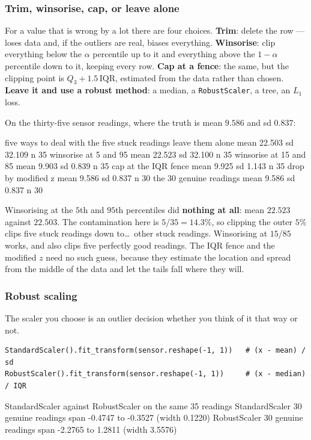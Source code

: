 \documentclass[11pt]{article}
\begin{document}
\subsubsection*{Trim, winsorise, cap, or leave alone}

For a value that is wrong by a lot there are four choices. \textbf{Trim}:
delete the row --- loses data and, if the outliers are real, biases everything.
\textbf{Winsorise}: clip everything below the $\alpha$ percentile up to it and
everything above the $1-\alpha$ percentile down to it, keeping every row.
\textbf{Cap at a fence}: the same, but the clipping point is
$Q_3 + 1.5\,\mathrm{IQR}$, estimated from the data rather than chosen.
\textbf{Leave it and use a robust method}: a median, a
\texttt{RobustScaler}, a tree, an $L_1$ loss.

On the thirty-five sensor readings, where the truth is mean $9.586$ and
sd $0.837$:

\begin{codeout}
five ways to deal with the five stuck readings
  leave them alone         mean  22.503   sd  32.109   n 35
  winsorise at 5 and 95    mean  22.523   sd  32.100   n 35
  winsorise at 15 and 85   mean   9.903   sd   0.839   n 35
  cap at the IQR fence     mean   9.925   sd   1.143   n 35
  drop by modified z       mean   9.586   sd   0.837   n 30
  the 30 genuine readings  mean   9.586   sd   0.837   n 30
\end{codeout}

\begin{caution}
Winsorising at the $5$th and $95$th percentiles did \textbf{nothing at all}:
mean $22.523$ against $22.503$. The contamination here is $5/35 = 14.3\%$, so
clipping the outer $5\%$ clips five stuck readings down to\dots\ other stuck
readings. Winsorising at $15$/$85$ works, and also clips five perfectly good
readings. The IQR fence and the modified $z$ need no such guess, because they
estimate the location and spread from the middle of the data and let the tails
fall where they will.
\end{caution}

\subsubsection*{Robust scaling}

The scaler you choose is an outlier decision whether you think of it that way
or not.

\begin{lstlisting}
StandardScaler().fit_transform(sensor.reshape(-1, 1))   # (x - mean) / sd
RobustScaler().fit_transform(sensor.reshape(-1, 1))     # (x - median) / IQR
\end{lstlisting}
\begin{codeout}
StandardScaler against RobustScaler on the same 35 readings
  StandardScaler  30 genuine readings span -0.4747 to -0.3527  (width 0.1220)
  RobustScaler    30 genuine readings span -2.2765 to  1.2811  (width 3.5576)
\end{codeout}
\end{document}
